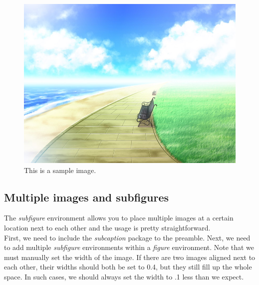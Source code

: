 \documentclass[11pt]{article}  %
\begin{document}
      \begin{figure}[H]  %
        \includegraphics[width=\linewidth]{support/sample.JPG}  %
        \caption{This is a sample image.}  %
        \label{f1}  %
      \end{figure}

    \subsection{Multiple images and subfigures}
      The \textit{subfigure} environment allows you to place multiple images at a certain location next to each other and the usage is pretty straightforward.\\

      First, we need to include the \textit{subcaption} package to the preamble. Next, we need to add multiple \textit{subfigure} environments within a \textit{figure} environment. Note that we must manually set the width of the image. If there are two images aligned next to each other, their widths should both be set to 0.4, but they still fill up the whole space. In such cases, we should always set the width to .1 less than we expect.
\end{document}
